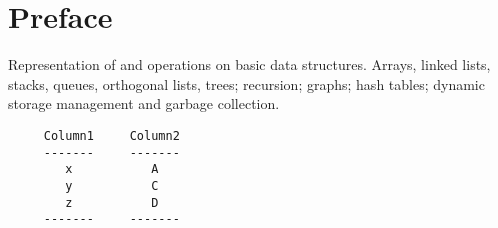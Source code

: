 
\chapter{Preface}

Representation of and operations on basic data structures.  Arrays,
linked lists, stacks, queues,
%
%
orthogonal lists, trees;
%
recursion; graphs;
hash tables; dynamic storage management and garbage collection.

\begin{verbatim}
     Column1     Column2
     -------     -------
        x           A
        y           C
        z           D
     -------     -------
\end{verbatim}

